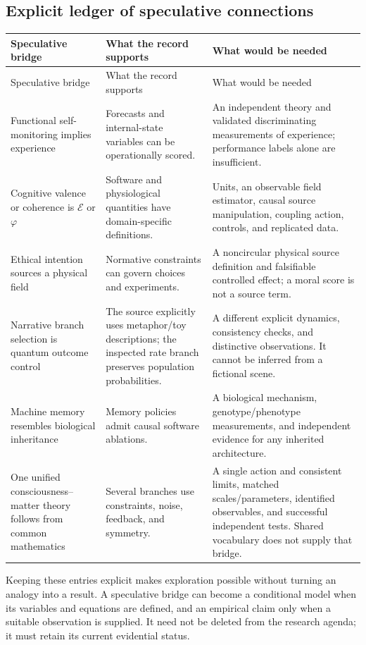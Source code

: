 \subsection{Explicit ledger of speculative connections}
\begin{longtable}{@{}>{\raggedright\arraybackslash}p{.25\linewidth}>{\raggedright\arraybackslash}p{.34\linewidth}>{\raggedright\arraybackslash}p{.34\linewidth}@{}}
\toprule
Speculative bridge & What the record supports & What would be needed\\\midrule
\endfirsthead
\toprule Speculative bridge & What the record supports & What would be needed\\\midrule\endhead
\bottomrule\endfoot
Functional self-monitoring implies experience & Forecasts and internal-state variables can be operationally scored. & An independent theory and validated discriminating measurements of experience; performance labels alone are insufficient.\\
Cognitive valence or coherence is $\mathcal E$ or $\varphi$ & Software and physiological quantities have domain-specific definitions. & Units, an observable field estimator, causal source manipulation, coupling action, controls, and replicated data.\\
Ethical intention sources a physical field & Normative constraints can govern choices and experiments. & A noncircular physical source definition and falsifiable controlled effect; a moral score is not a source term.\\
Narrative branch selection is quantum outcome control & The source explicitly uses metaphor/toy descriptions; the inspected rate branch preserves population probabilities. & A different explicit dynamics, consistency checks, and distinctive observations. It cannot be inferred from a fictional scene.\\
Machine memory resembles biological inheritance & Memory policies admit causal software ablations. & A biological mechanism, genotype/phenotype measurements, and independent evidence for any inherited architecture.\\
One unified consciousness--matter theory follows from common mathematics & Several branches use constraints, noise, feedback, and symmetry. & A single action and consistent limits, matched scales/parameters, identified observables, and successful independent tests. Shared vocabulary does not supply that bridge.\\
\end{longtable}

Keeping these entries explicit makes exploration possible without turning an analogy into a result. A speculative bridge can become a conditional model when its variables and equations are defined, and an empirical claim only when a suitable observation is supplied. It need not be deleted from the research agenda; it must retain its current evidential status.
